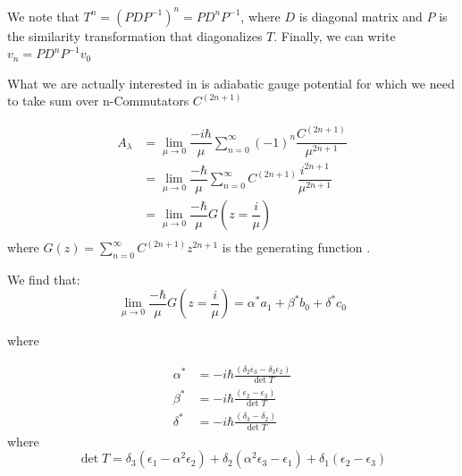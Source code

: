 \documentclass[11pt,a4paper]{article}
\begin{document}
We note that $T^n= (P D P^{-1})^n=P D^n P^{-1}$, where $D$ is diagonal matrix and $P$ is the similarity transformation that diagonalizes $T$. Finally, we can write $v_n= P D^n P^{-1} v_0$ 

What we are actually interested in is adiabatic gauge potential for which we need to take sum over n-Commutators $C^{(2n+1)}$

\begin{align*}
A_{\lambda} & =   \lim_{\mu \rightarrow 0}  \dfrac{-i\hbar}{\mu}  \sum_{n=0}^{\infty} (-1)^{n} \dfrac{C^{(2n+1)}}{\mu^{2n+1}}\\
& =   \lim_{\mu \rightarrow 0}  \dfrac{-\hbar}{\mu}  \sum_{n=0}^{\infty} C^{(2n+1)} \dfrac{i^{2n+1} }{\mu^{2n+1}}\\
&=   \lim_{\mu \rightarrow 0}  \dfrac{-\hbar}{\mu}  G\left( z=\dfrac{i}{\mu}\right)\\
\end{align*}
where $G(z)= \sum_{n=0}^{\infty} C^{(2n+1)} z^{2n+1}$ is the generating function \cite{wilf12generatingfunctionology}.


We find that:
\begin{equation}
 \lim_{\mu \rightarrow 0}  \dfrac{-\hbar}{\mu}  G\left( z=\dfrac{i}{\mu}\right)= \alpha^* a_1 + \beta^* b_0 + \delta^* c_0
\end{equation}

where 

\begin{equation}
\boxed{
\begin{aligned}
 \alpha^* &= - i \hbar \frac{  \left(\delta _2 \epsilon _3 -\delta _3 \epsilon _2\right)}{\det T} \\
  \beta^* &= -i \hbar \frac{ \left(\epsilon _2-\epsilon _3\right) }{\det T} \\
 \delta^*  &=- i \hbar \frac{ \left(\delta _3-\delta _2\right) }{\det T}
\end{aligned}
}
\end{equation}
where 
\begin{equation}
\det T = \delta _3 \left(\epsilon _1-\alpha ^2 \epsilon _2\right)+\delta _2 \left(\alpha ^2 \epsilon _3-\epsilon _1\right)+\delta _1 \left(\epsilon
   _2-\epsilon _3\right)
\end{equation}
\end{document}
